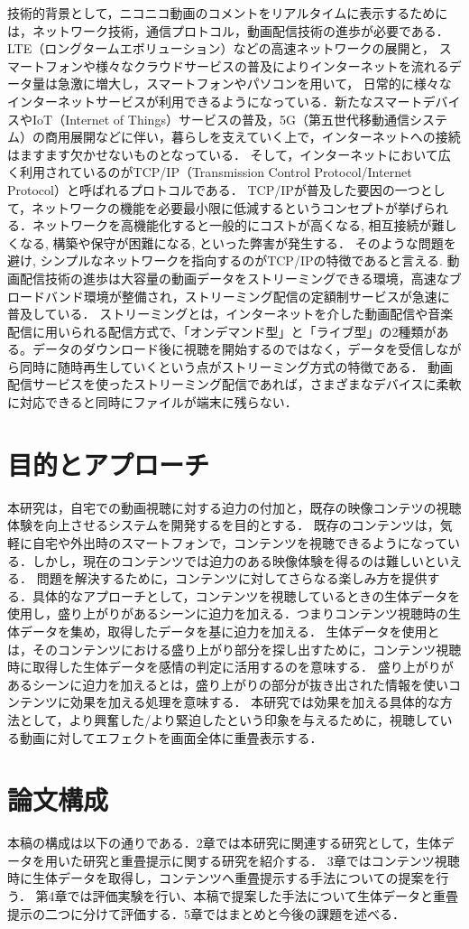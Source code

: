 技術的背景として，ニコニコ動画のコメントをリアルタイムに表示するためには，ネットワーク技術，通信プロトコル，動画配信技術の進歩が必要である．
LTE（ロングタームエボリューション）などの高速ネットワークの展開と， スマートフォンや様々なクラウドサービスの普及によりインターネットを流れるデータ量は急激に増大し，スマートフォンやパソコンを用いて，
日常的に様々なインターネットサービスが利用できるようになっている．新たなスマートデバイスやIoT（Internet of Things）サービスの普及，5G（第五世代移動通信システム）の商用展開などに伴い，暮らしを支えていく上で，インターネットへの接続はますます欠かせないものとなっている．
そして，インターネットにおいて広く利用されているのがTCP/IP（Transmission Control Protocol/Internet Protocol）と呼ばれるプロトコルである．
TCP/IPが普及した要因の一つとして，ネットワークの機能を必要最小限に低減するというコンセプトが挙げられる．ネットワークを高機能化すると一般的にコストが高くなる, 相互接続が難しくなる, 構築や保守が困難になる, といった弊害が発生する．
そのような問題を避け, シンプルなネットワークを指向するのがTCP/IPの特徴であると言える.
動画配信技術の進歩は大容量の動画データをストリーミングできる環境，高速なブロードバンド環境が整備され，ストリーミング配信の定額制サービスが急速に普及している．
ストリーミングとは，インターネットを介した動画配信や音楽配信に用いられる配信方式で、「オンデマンド型」と「ライブ型」の2種類がある。データのダウンロード後に視聴を開始するのではなく，データを受信しながら同時に随時再生していくという点がストリーミング方式の特徴である．
動画配信サービスを使ったストリーミング配信であれば，さまざまなデバイスに柔軟に対応できると同時にファイルが端末に残らない．

\section{目的とアプローチ}
本研究は，自宅での動画視聴に対する迫力の付加と，既存の映像コンテツの視聴体験を向上させるシステムを開発するを目的とする．
既存のコンテンツは，気軽に自宅や外出時のスマートフォンで，コンテンツを視聴できるようになっている．しかし，現在のコンテンツでは迫力のある映像体験を得るのは難しいといえる．
問題を解決するために，コンテンツに対してさらなる楽しみ方を提供する．具体的なアプローチとして，コンテンツを視聴しているときの生体データを使用し，盛り上がりがあるシーンに迫力を加える．つまりコンテンツ視聴時の生体データを集め，取得したデータを基に迫力を加える．
生体データを使用とは，そのコンテンツにおける盛り上がり部分を探し出すために，コンテンツ視聴時に取得した生体データを感情の判定に活用するのを意味する．
盛り上がりがあるシーンに迫力を加えるとは，盛り上がりの部分が抜き出された情報を使いコンテンツに効果を加える処理を意味する．
本研究では効果を加える具体的な方法として，より興奮した/より緊迫したという印象を与えるために，視聴している動画に対してエフェクトを画面全体に重畳表示する．

\section{論文構成}
本稿の構成は以下の通りである．2章では本研究に関連する研究として，生体データを用いた研究と重畳提示に関する研究を紹介する．
3章ではコンテンツ視聴時に生体データを取得し，コンテンツへ重畳提示する手法についての提案を行う．
第4章では評価実験を行い、本稿で提案した手法について生体データと重畳提示の二つに分けて評価する．5章ではまとめと今後の課題を述べる．

